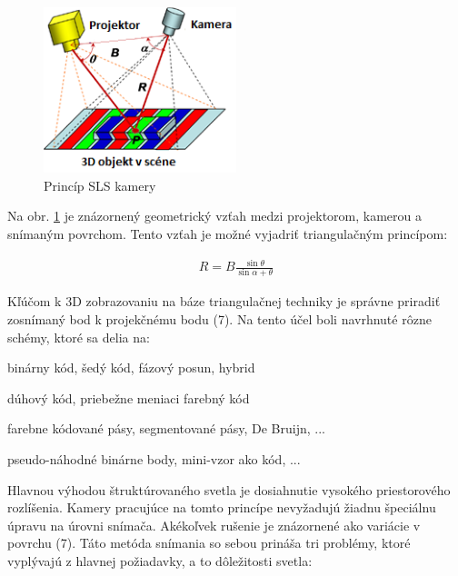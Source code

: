 \begin{figure}[h]

	\centering

	\includegraphics[width=0.5\textwidth]{figures/SLS.png} 

	\caption{Princíp SLS kamery}
	\label{fig:sls}

\end{figure}

Na obr. \ref{fig:sls} je znázornený geometrický vzťah medzi projektorom, kamerou a snímaným povrchom. Tento vzťah je možné vyjadriť triangulačným princípom:

\begin{equation}
\label{eq1}
\begin{aligned}
R=B\frac{\sin\theta}{\sin\alpha + \theta}
\end{aligned}
\end{equation}

Kľúčom k 3D zobrazovaniu na báze triangulačnej techniky je správne priradiť zosnímaný bod
k projekčnému bodu (7). Na tento účel boli navrhnuté rôzne schémy, ktoré sa delia na:

\begin{description}[leftmargin=*,labelsep=5.8mm, font=$\bullet$~\normalfont\scshape\color{black!20!black}]
	\item [Sekvenčnú projekciu] binárny kód, šedý kód, fázový posun, hybrid 
	\item [Priebežne meniacu projekciu] dúhový kód, priebežne meniaci farebný kód 
	\item [Pásikový index] farebne kódované pásy, segmentované pásy, De Bruijn, ...
	\item [Mriežkovaný index] pseudo-náhodné binárne body, mini-vzor ako kód, ...
	\item [Hybridné metódy]
\end{description}


Hlavnou výhodou štruktúrovaného svetla je dosiahnutie vysokého priestorového rozlíšenia.
Kamery pracujúce na tomto princípe nevyžadujú žiadnu špeciálnu úpravu na úrovni snímača.
Akékoľvek rušenie je znázornené ako variácie v povrchu (7). Táto metóda snímania so sebou
prináša tri problémy, ktoré vyplývajú z hlavnej požiadavky, a to dôležitosti svetla:

